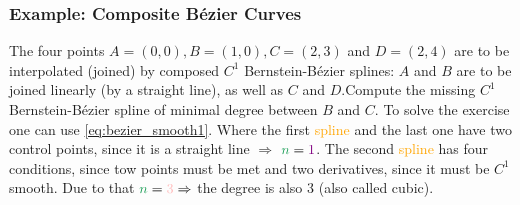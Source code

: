 \subsubsection{Example: Composite Bézier Curves}
The four points $A=(0,0), B=(1,0), C=(2,3)$ and $D=(2,4)$ are to be interpolated (joined) by composed $C^1$ Bernstein-Bézier splines: $A$ and $B$ are to be joined  linearly (by a straight line), as well as $C$ and $D$.\newline Compute the missing $C^1$ Bernstein-Bézier spline of minimal degree between $B$ and $C$. \newline\newline
To solve the exercise one can use \autoref{eq:bezier_smooth1}. Where the first \textcolor{orange}{spline} and the last one have two control points, since it is a straight line $\Rightarrow$ $\textcolor{ForestGreen}{n}=\textcolor{violet}{1}$. The second \textcolor{orange}{spline} has four conditions, since tow points must be met and two derivatives, since it must be $C^1$ smooth. Due to that $\textcolor{ForestGreen}{n}=\textcolor{pink}{3} \Rightarrow$ the degree is also 3 (also called cubic).
